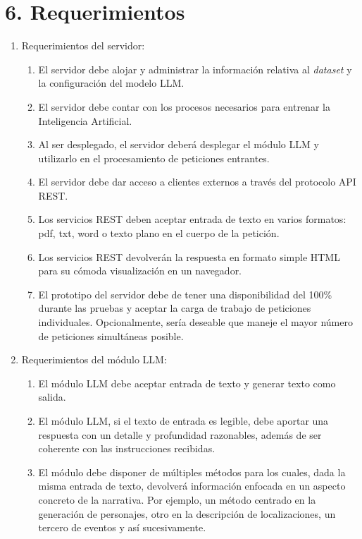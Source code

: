 \documentclass[
11pt, %
]{Clases/charter}
\begin{document}
\section{6. Requerimientos}
\label{sec:requerimientos}
\begin{enumerate}
	\item Requerimientos del servidor:
	      \begin{enumerate}
		      \item El servidor debe alojar y administrar la información relativa al \textit{dataset} y la configuración del modelo LLM.
		      \item El servidor debe contar con los procesos necesarios para entrenar la Inteligencia Artificial.
		      \item Al ser desplegado, el servidor deberá desplegar el módulo LLM y utilizarlo en el procesamiento de peticiones entrantes.
		      \item El servidor debe dar acceso a clientes externos a través del protocolo API REST.
		      \item Los servicios REST deben aceptar entrada de texto en varios formatos: pdf, txt, word o texto plano en el cuerpo de la petición.
		      \item Los servicios REST devolverán la respuesta en formato simple HTML para su cómoda visualización en un navegador.
		      \item El prototipo del servidor debe de tener una disponibilidad del 100\% durante las pruebas y aceptar la carga de trabajo de peticiones individuales.
		            Opcionalmente, sería deseable que maneje el mayor número de peticiones simultáneas posible.
	      \end{enumerate}
	\item Requerimientos del módulo LLM:
	      \begin{enumerate}
		      \item El módulo LLM debe aceptar entrada de texto y generar texto como salida.
		      \item El módulo LLM, si el texto de entrada es legible, debe aportar una respuesta con un detalle y profundidad razonables,
		            además de ser coherente con las instrucciones recibidas.
		      \item El módulo debe disponer de múltiples métodos para los cuales, dada la misma entrada de texto, devolverá información enfocada en un aspecto concreto de la narrativa.
		            Por ejemplo, un método centrado en la generación de personajes, otro en la descripción de localizaciones, un tercero de eventos y así sucesivamente.

\end{enumerate}
\end{enumerate}
\end{document}
